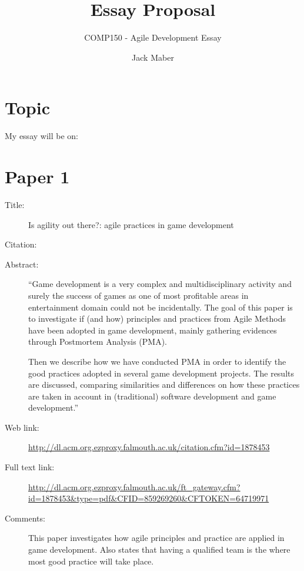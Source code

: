 \documentclass{scrartcl}
\title{Essay Proposal}
\subtitle{COMP150 - Agile Development Essay}
\author{Jack Maber}
\begin{document}
\maketitle

\section*{Topic}

My essay will be on:



\section*{Paper 1}
\begin{description}
\item[Title:] Is agility out there?: agile practices in game development
\item[Citation:] \cite{shannon}
\item[Abstract:] ``Game development is a very complex and multidisciplinary activity and surely the success of games as one of most profitable areas in entertainment domain could not be incidentally. The goal of this paper is to investigate if (and how) principles and practices from Agile Methods have been adopted in game development, mainly gathering evidences through Postmortem Analysis (PMA).

Then we describe how we have conducted PMA in order to identify the good practices adopted in several game development projects. The results are discussed, comparing similarities and differences on how these practices are taken in account in (traditional) software development and game development.''
\item[Web link:] \url{http://dl.acm.org.ezproxy.falmouth.ac.uk/citation.cfm?id=1878453}
\item[Full text link:] \url{http://dl.acm.org.ezproxy.falmouth.ac.uk/ft_gateway.cfm?id=1878453&type=pdf&CFID=859269260&CFTOKEN=64719971}
\item[Comments:] This paper investigates how agile principles and practice are applied in game development. Also states that having a qualified team is the where most good practice will take place.
\end{description}
\end{document}

